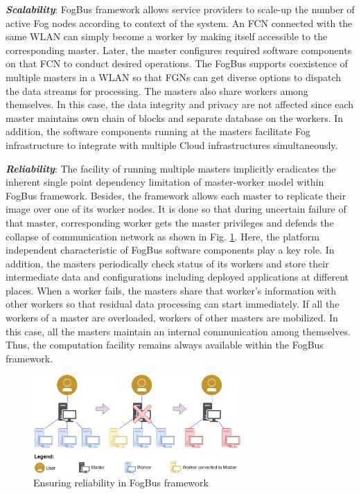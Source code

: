 \documentclass[final,5p,times,twocolumn]{elsarticle}
\begin{document}
\par \textbf{\textit{Scalability}}: FogBus framework allows service providers to scale-up the number of active Fog nodes according to context of the system. An FCN connected with the same WLAN can simply become a worker by making itself accessible to the corresponding master. Later, the master configures required software components on that FCN to conduct desired operations. The FogBus supports coexistence of multiple masters in a WLAN so that FGNs can get diverse options to dispatch the data streams for processing. The masters also share workers among themselves. In this case, the data integrity and privacy are not affected since each master maintains own chain of blocks and separate database on the workers. In addition, the software components running at the masters facilitate Fog infrastructure to integrate with multiple Cloud infrastructures simultaneously.
%
\par \textbf{\textit{Reliability}}: The facility of running multiple masters implicitly eradicates the inherent single point dependency limitation of master-worker model within FogBus framework. Besides, the framework allows each master to replicate their image over one of its worker nodes. It is done so that during uncertain failure of that master, corresponding worker gets the master privileges and defends the collapse of communication network as shown in Fig. \ref{Fig:reliability}. Here, the platform independent characteristic of FogBus software components play a key role. In addition, the masters periodically check status of its workers and store their intermediate data and configurations including deployed applications at different places. When a worker fails, the masters share that worker's information with other workers so that residual data processing can start immediately. If all the workers of a master are overloaded, workers of other masters are mobilized. In this case, all the masters maintain an internal communication among themselves. Thus, the computation facility remains always available within the FogBus framework.
%
\begin{figure}[!t]
\centering 
\includegraphics[width=80mm]{reliability.png}
\caption{Ensuring reliability in FogBus framework}
\label{Fig:reliability}
\end{figure} 
\end{document}
